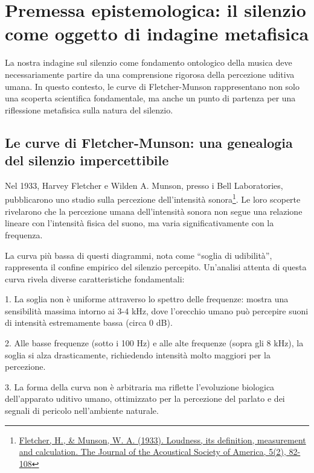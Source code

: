 \documentclass[a4paper,11pt]{article}
\begin{document}
\section{Premessa epistemologica: il silenzio come oggetto di indagine
metafisica}\label{premessa-epistemologica-il-silenzio-come-oggetto-di-indagine-metafisica}

La nostra indagine sul silenzio come fondamento ontologico della musica
deve necessariamente partire da una comprensione rigorosa della
percezione uditiva umana. In questo contesto, le curve di
Fletcher-Munson rappresentano non solo una scoperta scientifica
fondamentale, ma anche un punto di partenza per una riflessione
metafisica sulla natura del silenzio.

\subsection{Le curve di Fletcher-Munson: una genealogia del silenzio
impercettibile}\label{le-curve-di-fletcher-munson-una-genealogia-del-silenzio-impercettibile}

Nel 1933, Harvey Fletcher e Wilden A. Munson, presso i Bell
Laboratories, pubblicarono uno studio sulla percezione dell'intensità
sonora\footnote{\href{https://doi.org/10.1121/1.1915893}{Fletcher, H.,
  \& Munson, W. A. (1933). Loudness, its definition, measurement and
  calculation. The Journal of the Acoustical Society of America, 5(2),
  82-108}}. Le loro scoperte rivelarono che la percezione umana
dell'intensità sonora non segue una relazione lineare con l'intensità
fisica del suono, ma varia significativamente con la frequenza.

La curva più bassa di questi diagrammi, nota come ``soglia di
udibilità'', rappresenta il confine empirico del silenzio percepito.
Un'analisi attenta di questa curva rivela diverse caratteristiche
fondamentali:

1. La soglia non è uniforme attraverso lo spettro delle frequenze:
mostra una sensibilità massima intorno ai 3-4 kHz, dove l'orecchio umano
può percepire suoni di intensità estremamente bassa (circa 0 dB).

2. Alle basse frequenze (sotto i 100 Hz) e alle alte frequenze (sopra
gli 8 kHz), la soglia si alza drasticamente, richiedendo intensità molto
maggiori per la percezione.

3. La forma della curva non è arbitraria ma riflette l'evoluzione
biologica dell'apparato uditivo umano, ottimizzato per la percezione del
parlato e dei segnali di pericolo nell'ambiente naturale.
\end{document}
